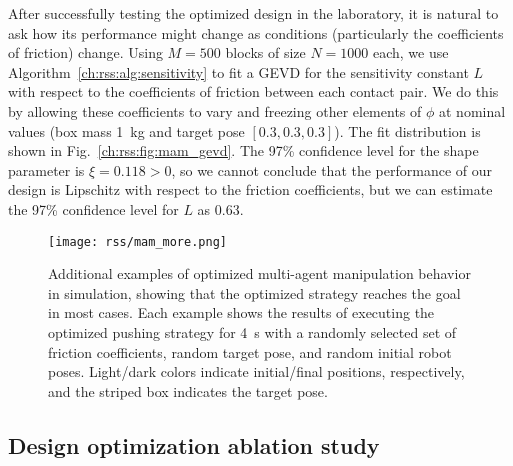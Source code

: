 After successfully testing the optimized design in the laboratory, it is natural to ask how its performance might change as conditions (particularly the coefficients of friction) change. Using $M = 500$ blocks of size $N=1000$ each, we use Algorithm~\ref{ch:rss:alg:sensitivity} to fit a GEVD for the sensitivity constant $L$ with respect to the coefficients of friction between each contact pair. We do this by allowing these coefficients to vary and freezing other elements of $\phi$ at nominal values (box mass \SI{1}{kg} and target pose $[0.3, 0.3, 0.3]$). The fit distribution is shown in Fig.~\ref{ch:rss:fig:mam_gevd}. The 97\% confidence level for the shape parameter is $\xi = 0.118 > 0$, so we cannot conclude that the performance of our design is Lipschitz with respect to the friction coefficients, but we can estimate the 97\% confidence level for $L$ as $0.63$.


\begin{figure}[t]
	\centering
	\texttt{[image: rss/mam\_more.png]}
	\caption{Additional examples of optimized multi-agent manipulation behavior in simulation, showing that the optimized strategy reaches the goal in most cases. Each example shows the results of executing the optimized pushing strategy for \SI{4}{s} with a randomly selected set of friction coefficients, random target pose, and random initial robot poses. Light/dark colors indicate initial/final positions, respectively, and the striped box indicates the target pose.}
	\label{ch:rss:fig:mam_more}
\end{figure}


\subsection{Design optimization ablation study}\label{ch:rss:ablation}

